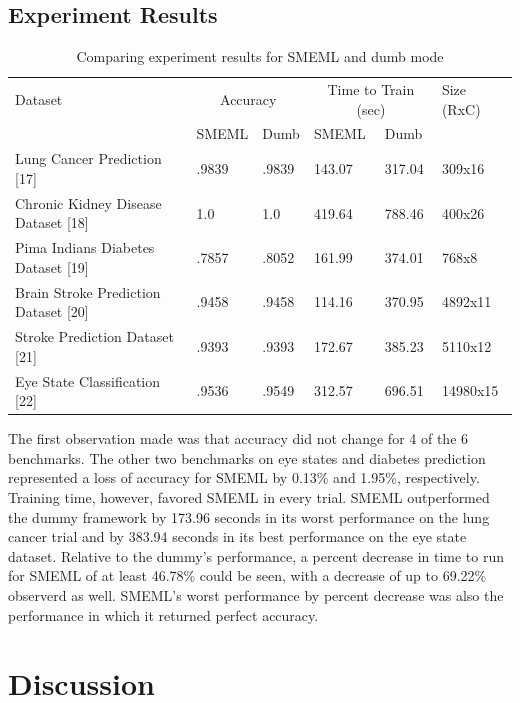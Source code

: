 \documentclass{article}
\begin{document}
\subsection{Experiment Results}
\begin{table}
  \caption{Comparing experiment results for SMEML and dumb mode}
  \label{model-options-table}
  \centering
  \begin{tabular}{llllll}
    \toprule
    Dataset & \multicolumn{2}{c}{Accuracy} & \multicolumn{2}{c}{Time to Train (sec)} & Size (RxC)\\
    \cmidrule(lr){2-3} \cmidrule(lr){4-5}
    & SMEML & Dumb & SMEML & Dumb \\
    \midrule
    Lung Cancer Prediction [17] & .9839 & .9839 & 143.07 & 317.04 & 309x16\\
    Chronic Kidney Disease Dataset [18] & 1.0 & 1.0 & 419.64 & 788.46 & 400x26\\
    Pima Indians Diabetes Dataset [19] & .7857 & .8052 & 161.99 & 374.01 & 768x8 \\
    Brain Stroke Prediction Dataset [20] & .9458 & .9458 & 114.16 & 370.95 & 4892x11\\
    Stroke Prediction Dataset [21] & .9393 & .9393 & 172.67 & 385.23 & 5110x12 \\
    Eye State Classification [22] & .9536 & .9549 & 312.57 & 696.51 & 14980x15\\ 
    \bottomrule
  \end{tabular}
\end{table}

The first observation made was that accuracy did not change for 4 of the 6 benchmarks. The other two benchmarks on eye states and diabetes prediction represented a loss of accuracy for SMEML by 0.13\% and 1.95\%, respectively. Training time, however, favored SMEML in every trial. SMEML outperformed the dummy framework by 173.96 seconds in its worst performance on the lung cancer trial and by 383.94 seconds in its best performance on the eye state dataset. Relative to the dummy's performance, a percent decrease in time to run for SMEML of at least 46.78\% could be seen, with a decrease of up to 69.22\% observerd as well. SMEML's worst performance by percent decrease was also the performance in which it returned perfect accuracy. 
\section{Discussion}
\end{document}
